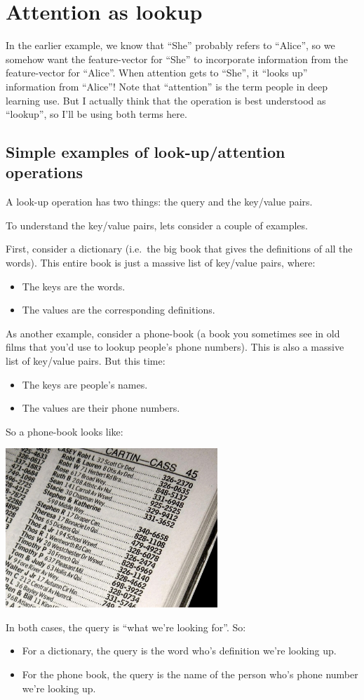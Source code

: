 \documentclass{article}
\begin{document}
\section{Attention as lookup}

In the earlier example, we know that ``She'' probably refers to ``Alice'', so we somehow want the feature-vector for ``She'' to incorporate information from the feature-vector for ``Alice''. When attention gets to ``She'', it ``looks up'' information from ``Alice''!
Note that ``attention'' is the term people in deep learning use.
But I actually think that the operation is best understood as ``lookup'', so I'll be using both terms here.

\subsection{Simple examples of look-up/attention operations}
A look-up operation has two things: the query and the key/value pairs.

To understand the key/value pairs, lets consider a couple of examples.

First, consider a dictionary (i.e.\ the big book that gives the definitions of all the words).
This entire book is just a massive list of key/value pairs, where:
\begin{itemize}
  \item The keys are the words.
  \item The values are the corresponding definitions.
\end{itemize}
As another example, consider a phone-book (a book you sometimes see in old films that you'd use to lookup people's phone numbers).  This is also a massive list of key/value pairs.  But this time:
\begin{itemize}
  \item The keys are people's names.
  \item The values are their phone numbers.
\end{itemize}
So a phone-book looks like:
\begin{center}
\includegraphics[width=0.6\textwidth]{phone_book}
\end{center}
In both cases, the query is ``what we're looking for''.  So:
\begin{itemize}
  \item For a dictionary, the query is the word who's definition we're looking up.
  \item For the phone book, the query is the name of the person who's phone number we're looking up.
\end{itemize}
\end{document}
